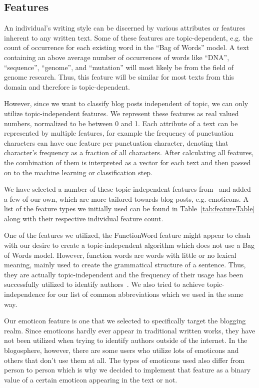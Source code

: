 \subsection{Features}
\label{sec:features}

An individual's writing style can be discerned by various attributes or features inherent to any written text.
Some of these features are topic-dependent, e.g. the count of occurrence for each existing word in the ``Bag of Words'' model.
A text containing an above average number of occurrences of words like ``DNA'', ``sequence'', ``genome'', and ``mutation'' will most likely be from the field of genome research.
Thus, this feature will be similar for most texts from this domain and therefore is topic-dependent.


However, since we want to classify blog posts independent of topic, we can only utilize topic-independent features.
We represent these features as real valued numbers, normalized to be between 0 and 1.
Each attribute of a text can be represented by multiple features, for example the frequency of punctuation characters can have one feature per punctuation character, denoting that character's frequency as a fraction of all characters.
After calculating all features, the combination of them is interpreted as a vector for each text and then passed on to the machine learning or classification step.


We have selected a number of these topic-independent features from~\cite{madigan2005author} and added a few of our own, which are more tailored towards blog posts, e.g. emoticons.
A list of the feature types we initially used can be found in Table~\ref{tab:featureTable} along with their respective individual feature count.


One of the features we utilized, the FunctionWord feature might appear to clash with our desire to create a topic-independent algorithm which does not use a Bag of Words model.
However, function words are words with little or no lexical meaning, mainly used to create the grammatical structure of a sentence.
Thus, they are actually topic-independent and the frequency of their usage has been successfully utilized to identify authors~\cite{mosteller1962applied}.
We also tried to achieve topic-independence for our list of common abbreviations which we used in the same way.


Our emoticon feature is one that we selected to specifically target the blogging realm.
Since emoticons hardly ever appear in traditional written works, they have not been utilized when trying to identify authors outside of the internet.
In the blogosphere, however, there are some users who utilize lots of emoticons and others that don't use them at all.
The types of emoticons used also differ from person to person which is why we decided to implement that feature as a binary value of a certain emoticon appearing in the text or not.


